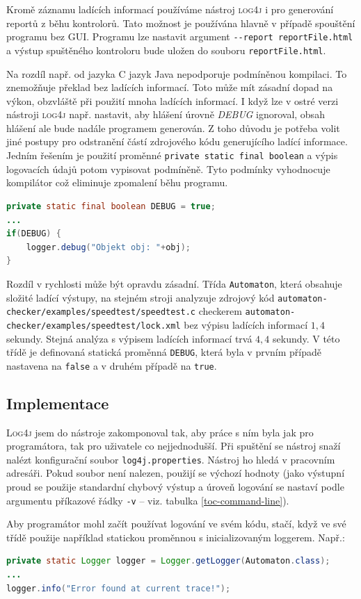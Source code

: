 \documentclass[11pt,final,oneside]{fithesis}
\begin{document}
Kromě záznamu ladících informací používáme nástroj \textsc{log4j} i pro generování reportů z běhu kontrolorů. Tato možnost je používána hlavně v případě spouštění programu bez GUI. Programu lze nastavit argument \verb|--report reportFile.html| a výstup spuštěného kontroloru bude uložen do souboru \verb|reportFile.html|.

Na rozdíl např. od jazyka C jazyk Java nepodporuje podmíněnou kompilaci. To znemožňuje překlad bez ladících informací. Toto může mít zásadní dopad na výkon, obzvláště při použití mnoha ladících informací. I když lze v ostré verzi nástroji \textsc{log4j} např. nastavit, aby hlášení úrovně \textit{DEBUG} ignoroval, obsah hlášení ale bude nadále programem generován. Z toho důvodu je potřeba volit jiné postupy pro odstranění částí zdrojového kódu generujícího ladící informace. Jedním řešením je použití proměnné \texttt{private static final boolean} a výpis logovacích údajů potom vypisovat podmíněně. Tyto podmínky vyhodnocuje kompilátor což eliminuje zpomalení běhu programu.
\begin{lstlisting}[language=Java]
private static final boolean DEBUG = true;
...
if(DEBUG) {
    logger.debug("Objekt obj: "+obj);
}
\end{lstlisting}

Rozdíl v rychlosti může být opravdu zásadní. Třída \texttt{Automaton}, která obsahuje složité ladící výstupy, na stejném stroji analyzuje zdrojový kód \texttt{automaton-checker/examples/speedtest/speedtest.c} che\-cke\-rem \texttt{automaton-checker/examples/speedtest/lock.xml} bez výpisu ladících informací $1,4$ sekundy. Stejná analýza s výpisem ladících informací trvá $4,4$ sekundy. V této třídě je definovaná statická proměnná \texttt{DEBUG}, která byla v prvním případě nastavena na \texttt{false} a v druhém případě na \texttt{true}.


\subsection{Implementace}
\textsc{Log4j} jsem do nástroje zakomponoval tak, aby práce s ním byla jak pro programátora, tak pro uživatele co nejjednodušší. Při spuštění se nástroj snaží nalézt konfigurační soubor \verb|log4j.properties|. Nástroj ho hledá v pracovním adresáři. Pokud soubor není nalezen, použijí se výchozí hodnoty (jako výstupní proud se použije standardní chybový výstup a úroveň logování se nastaví podle argumentu příkazové řádky \verb|-v| -- viz. tabulka \ref{toc-command-line}).

Aby programátor mohl začít používat logování ve svém kódu, stačí, když ve své třídě použije například statickou proměnnou s inicializovaným loggerem. Např.:
\begin{lstlisting}[language=Java]
private static Logger logger = Logger.getLogger(Automaton.class);
...
logger.info("Error found at current trace!");
\end{lstlisting}
\end{document}
